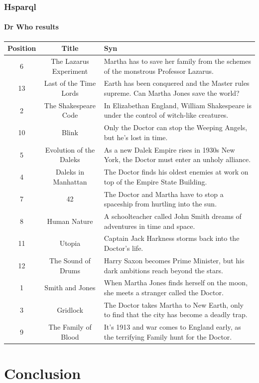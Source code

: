 \documentclass{beamer}
\begin{document}
\begin{frame}
\frametitle{Hsparql}
\framesubtitle{Dr Who results}

\begin{center}

\scriptsize
\begin{tabular}{| c | c | >{\tiny}p{5.5cm} |}
\hline
\textbf{Position} & \textbf{Title} & \textbf{Syn} \\
\hline
6 & The Lazarus Experiment & Martha has to save her family from the
schemes of the monstrous Professor Lazarus. \\
13 & Last of the Time Lords & Earth has been conquered and the Master
rules supreme. Can Martha Jones save the world? \\
2 & The Shakespeare Code & In Elizabethan England, William Shakespeare
is under the control of witch-like creatures. \\
10 & Blink & Only the Doctor can stop the Weeping Angels, but he's
lost in time. \\
5 & Evolution of the Daleks & As a new Dalek Empire rises in 1930s New
York, the Doctor must enter an unholy alliance. \\
4 & Daleks in Manhattan & The Doctor finds his oldest enemies at work
on top of the Empire State Building. \\
7 & 42 & The Doctor and Martha have to stop a spaceship from hurtling
into the sun. \\
8 & Human Nature & A schoolteacher called John Smith dreams of
adventures in time and space. \\
11 & Utopia & Captain Jack Harkness storms back into the Doctor's
life. \\
12 & The Sound of Drums & Harry Saxon becomes Prime Minister, but his
dark ambitions reach beyond the stars. \\
1 & Smith and Jones & When Martha Jones finds herself on the moon, she
meets a stranger called the Doctor. \\
3 & Gridlock & The Doctor takes Martha to New Earth, only to find that
the city has become a deadly trap. \\
9 & The Family of Blood & It's 1913 and war comes to England early, as
the terrifying Family hunt for the Doctor. \\
\hline
\end{tabular}
\end{center}

\end{frame}

\section{Conclusion}
\end{document}
